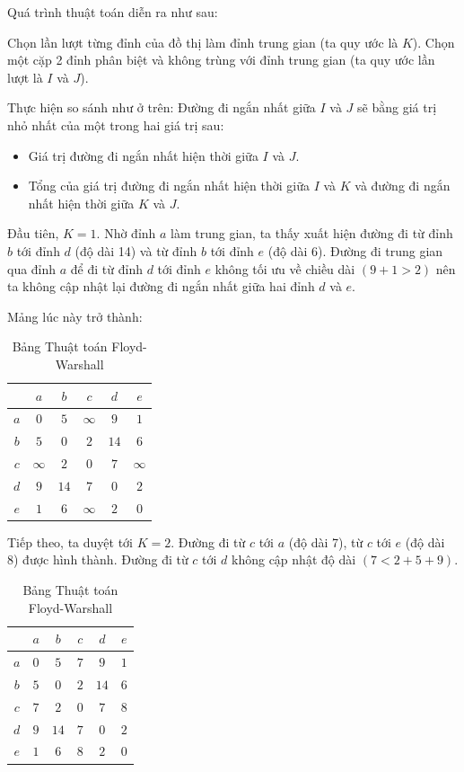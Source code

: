 \documentclass[12pt,oneside,a4paper]{bookAnh1}
\theoremstyle{plain}
\theoremstyle{nonumberplain}
\numberwithin{equation}{chapter}
\begin{document}
{Quá trình thuật toán diễn ra như sau:

Chọn lần lượt từng đỉnh của đồ thị làm đỉnh trung gian (ta quy ước là $K$). Chọn một cặp 2 đỉnh phân biệt và không trùng với đỉnh trung gian (ta quy ước lần lượt là $I$ và $J$).

Thực hiện so sánh như ở trên: Đường đi ngắn nhất giữa $I$ và $J$ sẽ bằng giá trị nhỏ nhất của một trong hai giá trị sau:
\begin{itemize}
    \item Giá trị đường đi ngắn nhất hiện thời giữa 
$I$ và $J$.
\item Tổng của giá trị đường đi ngắn nhất hiện thời giữa $I$ và $K$ và đường đi ngắn nhất hiện thời giữa $K$ và $J$.
\end{itemize}
Đầu tiên, $K=1$. Nhờ đỉnh $a$ làm trung gian, ta thấy xuất hiện đường đi từ đỉnh $b$ tới đỉnh $d$ (độ dài 14) và từ đỉnh $b$ tới đỉnh $e$ (độ dài 6). Đường đi trung gian qua đỉnh $a$ để đi từ đỉnh $d$ tới đỉnh $e$ không tối ưu về chiều dài $(9+1>2)$ nên ta không cập nhật lại đường đi ngắn nhất giữa hai đỉnh $d$ và $e$.

Mảng lúc này trở thành:
\begin{table}[hpt!]
        \centering
          \caption{Bảng Thuật toán Floyd-Warshall}
        \label{tab1}
       \begin{tabular}{c c c c c c}
  \hline
   & $a$ & $b$  & $c$ & $d$ & $e$  \\
  \hline
$a$ & $0$ & $5$  & $\infty$  & $9$ & $1$\\
$b$ & $5$ & $0$  & $2$  & $14$ & $6$\\
$c$ & $\infty$ & $2$  & $0$  & $7$ & $\infty$\\
$d$ & $9$ & $14$  & $7$  & $0$ & $2$\\
$e$ & $1$ & $6$  & $\infty$  & $2$ & $0$\\
 \hline
\end{tabular}
    \end{table}
    
Tiếp theo, ta duyệt tới $K=2$. Đường đi từ 
$c$ tới $a$ (độ dài 7), từ $c$ tới $e$ (độ dài 8) được hình thành. Đường đi từ $c$ tới 
$d$ không cập nhật độ dài $(7<2+5+9)$.
\begin{table}[hpt!]
        \centering
             \caption{Bảng Thuật toán Floyd-Warshall}
        \label{tab1}
       \begin{tabular}{c c c c c c }
  \hline
   & $a$ & $b$  & $c$ & $d$ & $e$  \\
  \hline
$a$ & $0$ & $5$  & $7$  & $9$ & $1$\\
$b$ & $5$ & $0$  & $2$  & $14$ & $6$\\
$c$ & $7$ & $2$  & $0$  & $7$ & $8$\\
$d$ & $9$ & $14$  & $7$  & $0$ & $2$\\
$e$ & $1$ & $6$  & $8$  & $2$ & $0$\\
 \hline
\end{tabular}
    \end{table}

}
\end{document}
